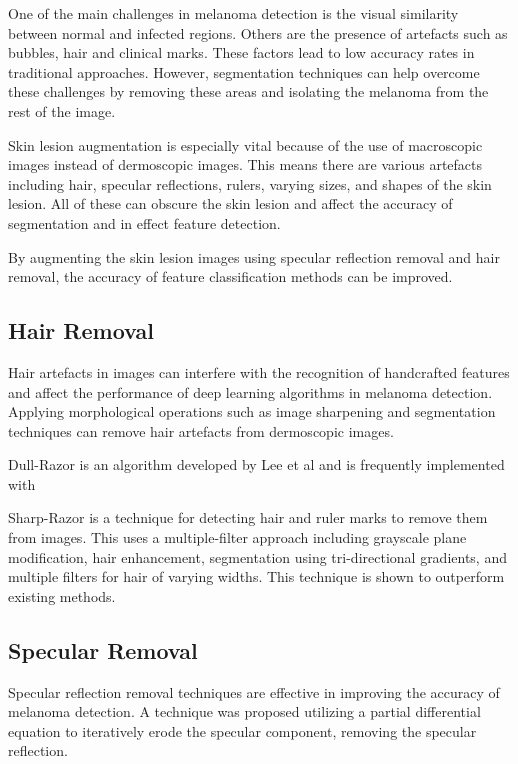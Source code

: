 One of the main challenges in melanoma detection is the visual similarity between normal and infected regions. Others are the presence of artefacts such as bubbles, hair and clinical marks\cite{Albahli2020}. These factors lead to low accuracy rates in traditional approaches. However, segmentation techniques can help overcome these challenges by removing these areas and isolating the melanoma from the rest of the image.

Skin lesion augmentation is especially vital because of the use of macroscopic images instead of dermoscopic images. This means there are various artefacts including hair, specular reflections, rulers, varying sizes, and shapes of the skin lesion. All of these can obscure the skin lesion and affect the accuracy of segmentation\cite{Unver2019} and in effect feature detection.

By augmenting the skin lesion images using specular reflection removal and hair removal, the accuracy of feature classification methods can be improved\cite{kasmi2023}. 



\subsection{Hair Removal}
Hair artefacts in images can interfere with the recognition of handcrafted features and affect the performance of deep learning algorithms in melanoma detection\cite{kasmi2023}. Applying morphological operations such as image sharpening and segmentation techniques can remove hair artefacts from dermoscopic images\cite{kasmi2023}.

Dull-Razor is an algorithm developed by Lee et al\cite{Lee1997} and is frequently implemented with 

Sharp-Razor\cite{kasmi2023} is a technique for detecting hair and ruler marks to remove them from images. This uses a multiple-filter approach including grayscale plane modification, hair enhancement, segmentation using tri-directional gradients, and multiple filters for hair of varying widths. This technique is shown to outperform existing methods.

\subsection{Specular Removal}
Specular reflection removal techniques are effective in improving the accuracy of melanoma detection\cite{Shen2009}. A technique was proposed utilizing a partial differential equation to iteratively erode the specular component, removing the specular reflection\cite{Shen2009}.


